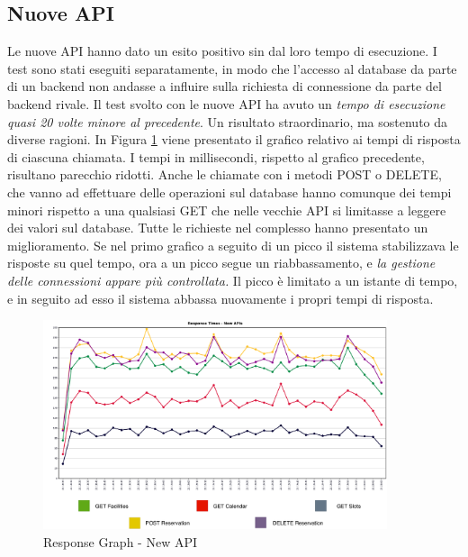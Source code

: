 \subsection{Nuove API}
Le nuove API hanno dato un esito positivo sin dal loro tempo di esecuzione. I test sono stati eseguiti separatamente, in modo che l'accesso al database da parte di un backend non andasse a influire sulla richiesta di connessione da parte del backend rivale. Il test svolto con le nuove API ha avuto un \emph{tempo di esecuzione quasi 20 volte minore al precedente}. Un risultato straordinario, ma sostenuto da diverse ragioni. In Figura \ref{fig:newapi100t_response} viene presentato il grafico relativo ai tempi di risposta di ciascuna chiamata. I tempi in millisecondi, rispetto al grafico precedente, risultano parecchio ridotti. Anche le chiamate con i metodi POST o DELETE, che vanno ad effettuare delle operazioni sul database hanno comunque dei tempi minori rispetto a una qualsiasi GET che nelle vecchie API si limitasse a leggere dei valori sul database. Tutte le richieste nel complesso hanno presentato un miglioramento. Se nel primo grafico a seguito di un picco il sistema stabilizzava le risposte su quel tempo, ora a un picco segue un riabbassamento, e \emph{la gestione delle connessioni appare più controllata.} Il picco è limitato a un istante di tempo, e in seguito ad esso il sistema abbassa nuovamente i propri tempi di risposta.
\begin{figure}
    \centering
    \includegraphics[width=0.90\textwidth]{images/04_3_new_api_response_graph_legend.pdf}
    \caption{Response Graph - New API}
    \label{fig:newapi100t_response}
\end{figure}
